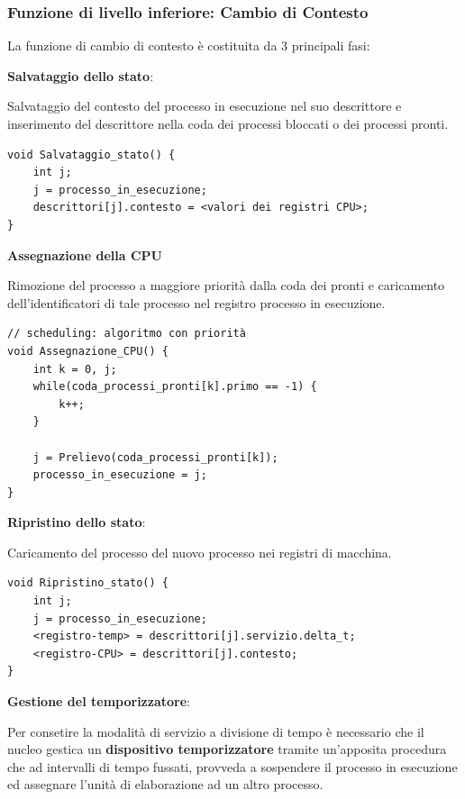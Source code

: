 \documentclass{article}
\begin{document}
\subsubsection{Funzione di livello inferiore: Cambio di Contesto}

La funzione di cambio di contesto è costituita da 3 principali fasi:

\vspace{3mm}
\textbf{Salvataggio dello stato}:

Salvataggio del contesto del processo in esecuzione nel suo descrittore e inserimento del descrittore nella coda dei processi bloccati
o dei processi pronti.

\begin{lstlisting}
void Salvataggio_stato() {
    int j;
    j = processo_in_esecuzione;
    descrittori[j].contesto = <valori dei registri CPU>;
}
\end{lstlisting}

\vspace{3mm}
\textbf{Assegnazione della CPU}

Rimozione del processo a maggiore priorità dalla coda dei pronti e caricamento dell'identificatori di tale processo nel registro
processo in esecuzione.

\begin{lstlisting}
// scheduling: algoritmo con priorità
void Assegnazione_CPU() {
    int k = 0, j;
    while(coda_processi_pronti[k].primo == -1) {
        k++;
    }

    j = Prelievo(coda_processi_pronti[k]);
    processo_in_esecuzione = j;
}
\end{lstlisting}

\vspace{3mm}
\textbf{Ripristino dello stato}:

Caricamento del processo del nuovo processo nei registri di macchina.

\begin{lstlisting}
void Ripristino_stato() {
    int j;
    j = processo_in_esecuzione;
    <registro-temp> = descrittori[j].servizio.delta_t;
    <registro-CPU> = descrittori[j].contesto;
}
\end{lstlisting}

\vspace{3mm}
\textbf{Gestione del temporizzatore}:

Per consetire la modalità di servizio a divisione di tempo è necessario che il nucleo gestica un \textbf{dispositivo temporizzatore}
tramite un'apposita procedura che ad intervalli di tempo fussati, provveda a sospendere il processo in esecuzione ed assegnare l'unità
di elaborazione ad un altro processo.
\end{document}
